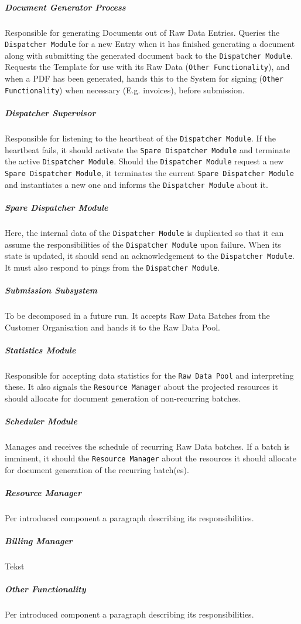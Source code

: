 \documentclass[a4paper,10pt]{article}
\begin{document}
\subparagraph{Document Generator Process}
Responsible for generating Documents out of Raw Data Entries. Queries the \texttt{Dispatcher Module} for a new Entry when it has finished generating a document along with submitting the generated document back to the \texttt{Dispatcher Module}. Requests the Template for use with its Raw Data (\texttt{Other Functionality}), and when a PDF has been generated, hands this to the System for signing (\texttt{Other Functionality}) when necessary (E.g. invoices), before submission.

\subparagraph{Dispatcher Supervisor}
Responsible for listening to the heartbeat of the \texttt{Dispatcher Module}. If the heartbeat fails, it should activate the \texttt{Spare Dispatcher Module} and terminate the active \texttt{Dispatcher Module}. Should the \texttt{Dispatcher Module} request a new \texttt{Spare Dispatcher Module}, it terminates the current \texttt{Spare Dispatcher Module} and instantiates a new one and informs the \texttt{Dispatcher Module} about it.

\subparagraph{Spare Dispatcher Module}
Here, the internal data of the \texttt{Dispatcher Module} is duplicated so that it can assume the responsibilities of the \texttt{Dispatcher Module} upon failure. When its state is updated, it should send an acknowledgement to the \texttt{Dispatcher Module}. It must also respond to pings from the \texttt{Dispatcher Module}.

\subparagraph{Submission Subsystem}
To be decomposed in a future run. It accepts Raw Data Batches from the Customer Organisation and hands it to the Raw Data Pool.

\subparagraph{Statistics Module}
Responsible for accepting data statistics for the \texttt{Raw Data Pool} and interpreting these. It also signals the \texttt{Resource Manager} about the projected resources it should allocate for document generation of non-recurring batches.

\subparagraph{Scheduler Module}
Manages and receives the schedule of recurring Raw Data batches. If a batch is imminent, it should the \texttt{Resource Manager} about the resources it should allocate for document generation of the recurring batch(es).

\subparagraph{Resource Manager}
Per introduced component a paragraph describing its responsibilities.

\subparagraph{Billing Manager}
Tekst

\subparagraph{Other Functionality}
Per introduced component a paragraph describing its responsibilities.
\end{document}
